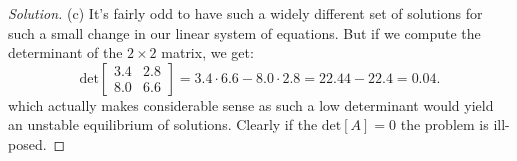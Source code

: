\documentclass[12pt]{amsart}
\newenvironment{solution}
{\begin{proof}[Solution]}
{\end{proof}}
\begin{document}
\begin{onehalfspace}
\begin{solution}
            (c) It's fairly odd to have such a widely different set of solutions for such a small change in our linear
            system of equations. But if we compute the determinant of the $2\times 2$ matrix, we get:
            \begin{displaymath}
                \text{det}\left[\begin{matrix}
                        3.4 & 2.8 \\
                        8.0 & 6.6
                \end{matrix}\right] = 3.4\cdot 6.6 - 8.0\cdot 2.8 = 22.44 - 22.4 = 0.04.
            \end{displaymath}
            which actually makes considerable sense as such a low determinant would yield an unstable equilibrium of
            solutions. Clearly if the $\text{det}[A] = 0$ the problem is ill-posed.
        \end{solution}
    \end{onehalfspace}
\end{document}
